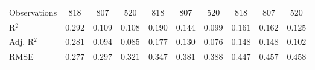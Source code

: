 \begin{center}
\begin{small}
\begin{longtable}{l@{} c@{} c@{} c@{} c@{} c@{} c@{} c@{} c@{} c@{}}
\hline
Observations                        & $818$            & $807$           & $520$           & $818$            & $807$            & $520$            & $818$            & $807$            & $520$            \\
R$^2$                               & $0.292$          & $0.109$         & $0.108$         & $0.190$          & $0.144$          & $0.099$          & $0.161$          & $0.162$          & $0.125$          \\
Adj. R$^2$                          & $0.281$          & $0.094$         & $0.085$         & $0.177$          & $0.130$          & $0.076$          & $0.148$          & $0.148$          & $0.102$          \\
RMSE                                & $0.277$          & $0.297$         & $0.321$         & $0.347$          & $0.381$          & $0.388$          & $0.447$          & $0.457$          & $0.458$          \\
\end{longtable}
\end{small}
\end{center}
